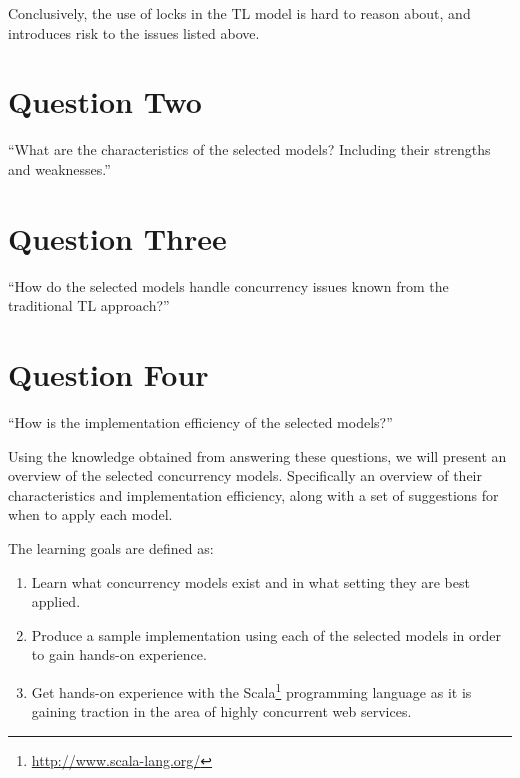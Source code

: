 Conclusively, the use of locks in the \ac{TL} model is hard to reason about, and introduces risk to the issues listed above. 

\section{Question Two}
``What are the characteristics of the selected models? Including their strengths and weaknesses.''
\section{Question Three}
``How do the selected models handle concurrency issues known from the traditional \ac{TL} approach?''
\section{Question Four}
``How is the implementation efficiency of the selected models?''


Using the knowledge obtained from answering these questions, we will present an overview of the selected concurrency models. Specifically an overview of their characteristics and implementation efficiency, along with a set of suggestions for when to apply each model.




The learning goals are defined as:
\begin{enumerate}
\item Learn what concurrency models exist and in what setting they are best applied.
\item Produce a sample implementation using each of the selected models in order to gain hands-on experience.
\item Get hands-on experience with the Scala\footnote{\url{http://www.scala-lang.org/}} programming language as it is gaining traction in the area of highly concurrent web services.
\end{enumerate}
\worksheetend